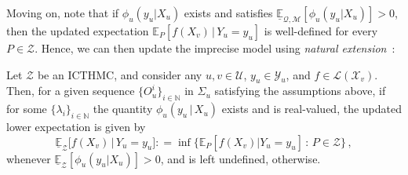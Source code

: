 \documentclass[twoside,11pt]{article}
\newcommand{\nats}{\mathbb{N}}
\newcommand{\states}{\mathcal{X}}
\newcommand{\observs}{\mathcal{Y}}
\newcommand{\lexp}{\underline{\mathbb{E}}_{\rateset,\mathcal{M}}}
\newcommand{\gambles}{\mathcal{L}}
\newcommand{\rateset}{\mathcal{Q}}
\newcommand{\coloneqq}{:\!=}
\begin{document}


Moving on, note that if $\phi_u(y_u\vert X_u)$ exists and satisfies $\lexp[\phi_u(y_u\vert X_u)]>0$, then the updated expectation $\mathbb{E}_P[f(X_v)\,\vert\,Y_u=y_u]$ is well-defined for every $P\in\mathcal{Z}$. Hence, we can then update the imprecise model using \emph{natural extension}~\citep{Walley:1991vk}:
\begin{definition}\label{def:reg_ext_densities}
Let $\mathcal{Z}$ be an ICTHMC, and consider any $u,v\in\mathcal{U}$, $y_u\in\observs_u$, and $f\in\gambles(\states_v)$. Then, for a given sequence $\{O_u^i\}_{i\in\nats}$ in $\Sigma_u$ satisfying the assumptions above, if for some $\{\lambda_i\}_{i\in\nats}$ the quantity $\phi_u(y_u\,\vert\,X_u)$ exists and is real-valued, the updated lower expectation is given by 
\begin{equation*}
\underline{\mathbb{E}}_{\mathcal{Z}}\bigl[f(X_v)\,\vert\,Y_u = y_u\bigr] \coloneqq \inf\{\mathbb{E}_P[f(X_v)\vert Y_u=y_u]\,:\,P\in\mathcal{Z}\}\,,
\end{equation*}
whenever $\underline{\mathbb{E}}_\mathcal{Z}[\phi_u(y_u\vert X_u)] >0$, and is left undefined, otherwise.
\end{definition}
\end{document}
